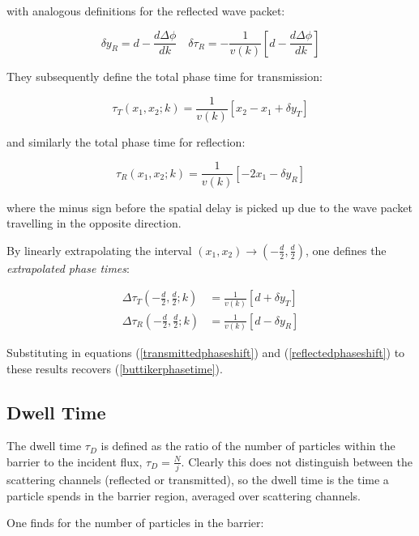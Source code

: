 \documentclass{article}
\begin{document}
\noindent with analogous definitions for the reflected wave packet:

\begin{equation}
	\delta y_R = d-\frac{d\Delta\phi}{dk} \quad \delta\tau_R=-\frac{1}{v(k)} \left[d-\frac{d\Delta\phi}{dk}\right]
	\label{reflectedphaseshift}
\end{equation}

\noindent They subsequently define the total phase time for transmission:

\begin{equation}
	\tau_T(x_1,x_2;k) = \frac{1}{v(k)}[x_2-x_1+\delta y_T]
\end{equation}

\noindent and similarly the total phase time for reflection:

\begin{equation}
	\tau_R(x_1,x_2;k) = \frac{1}{v(k)}[-2x_1-\delta y_R]
\end{equation}

\noindent where the minus sign before the spatial delay is picked up due to the wave packet travelling in the opposite direction.

\noindent By linearly extrapolating the interval $(x_1,x_2) \rightarrow (-\frac{d}{2},\frac{d}{2})$, one defines the \textit{extrapolated phase times}:

\begin{align}
	\Delta\tau_T(-\frac{d}{2},\frac{d}{2};k) &= \frac{1}{v(k)}[d+\delta y_T] \\
	\Delta\tau_R(-\frac{d}{2},\frac{d}{2};k) &= \frac{1}{v(k)}[d-\delta y_R]
\end{align}

\noindent Substituting in equations (\ref{transmittedphaseshift}) and (\ref{reflectedphaseshift}) to these results recovers (\ref{buttikerphasetime}).

\subsection{Dwell Time}

The dwell time $\tau_D$ is defined as the ratio of the number of particles within the barrier to the incident flux, $\tau_D = \frac{N}{j}$. Clearly this does not distinguish between the scattering channels (reflected or transmitted), so the dwell time is the time a particle spends in the barrier region, averaged over scattering channels.

\noindent One finds for the number of particles in the barrier:
\end{document}
